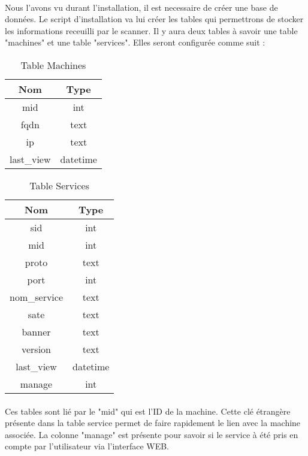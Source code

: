\documentclass[12pt]{report}
\begin{document}
		\paragraph{}
			Nous l'avons vu durant l'installation, il est necessaire de créer une base de données. Le script d'installation va lui créer les tables qui permettrons de stocker les informations receuilli par le scanner. Il y aura deux tables à savoir une table "machines" et une table "services". Elles seront configurée comme suit :\\
			\begin{table}[h]
			\centering
			\begin{tabular}{|c|c|}
				\hline
					Nom & Type \\
				\hline
				\hline
					mid & int \\
				\hline
					fqdn & text \\
				\hline
					ip & text \\
				\hline
					last\_view & datetime\\
				\hline
			\end{tabular}
			\caption{\label{machines_bdd} Table Machines}
			\end{table}
			\begin{table}[h]
			\centering
			\begin{tabular}{|c|c|}
				\hline
					Nom & Type \\
				\hline
				\hline
					sid & int \\
				\hline
					mid & int \\
				\hline
					proto & text \\
				\hline
					port & int \\
				\hline
					nom\_service & text \\
				\hline
					sate & text \\
				\hline
					banner & text \\
				\hline
					version & text \\
				\hline
					last\_view & datetime \\
				\hline
					manage & int \\
				\hline
			\end{tabular}
			\caption{\label{services_bdd} Table Services}
			\end{table}
		\paragraph{}
			Ces tables sont lié par le "mid" qui est l'ID de la machine. Cette clé étrangère présente dans la table service permet de faire rapidement le lien avec la machine associée. La colonne "manage" est présente pour savoir si le service à été pris en compte par l'utilisateur via l'interface WEB.
\end{document}
